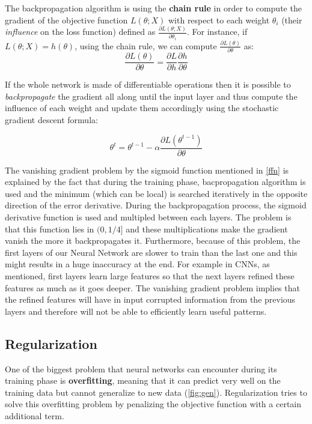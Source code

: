 \documentclass[master, tikz, final,11pt, dvipdfmx]{iscs-thesis}
\begin{document}
The backpropagation algorithm is using the \textbf{chain rule} in order to compute the gradient of the objective function $L(\theta; X)$ with respect to each weight $\theta_i$ (their \textit{influence} on the loss function) defined as $\frac{\partial L(\theta; X)}{\partial \theta_i}$. For instance, if $L(\theta; X) = h(\theta)$, using the chain rule, we can compute $\frac{\partial L(\theta)}{\partial \theta}$ as:
\[
\frac{\partial L(\theta)}{\partial \theta} = \frac{\partial L}{\partial h} \frac{\partial h}{\partial \theta}
\]

If the whole network is made of differentiable operations then it is possible to \textit{backpropagate} the gradient all along until the input layer and thus compute the influence of each weight and update them accordingly using the stochastic gradient descent formula:

 \[
\theta^t = \theta^{t-1} - \alpha \frac{\partial L(\theta^{t-1})}{\partial \theta}
 \]

The vanishing gradient problem by the sigmoid function mentioned in \autoref{ffn} is explained by the fact that during the training phase, bacpropagation algorithm is used and the minimum (which can be local) is searched iteratively in the opposite direction of the error derivative. During the backpropagation process, the sigmoid derivative function is used and multipled between each layers. The problem is that this function lies in $(0, 1/4]$ and these multiplications make the gradient vanish the more it backpropagates it.
Furthermore, because of this problem, the first layers of our Neural Network are slower to train than the last one and this might results in a huge inaccuracy at the end. For example in CNNs, as mentioned, first layers learn large features so that the next layers refined these features as much as it goes deeper. The vanishing gradient problem implies that the refined features will have in input corrupted information from the previous layers and therefore will not be able to efficiently learn useful patterns.

\subsection{Regularization}

One of the biggest problem that neural networks can encounter during its training phase is \textbf{overfitting}, meaning that it can predict very well on the training data but cannot generalize to new data (\autoref{fig:gen}). Regularization tries to solve this overfitting problem by penalizing the objective function with a certain additional term.
\end{document}
